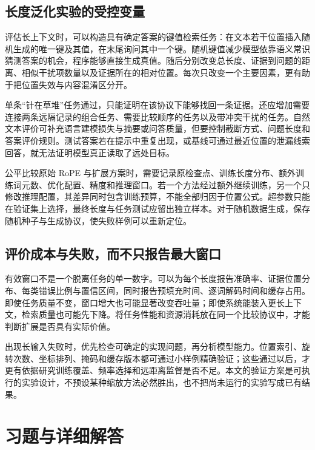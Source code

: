 \documentclass[UTF8,12pt,a4paper,fontset=fandol]{ctexart}
\begin{document}
\subsection{长度泛化实验的受控变量}
评估长上下文时，可以构造具有确定答案的键值检索任务：在文本若干位置插入随机生成的唯一键及其值，在末尾询问其中一个键。随机键值减少模型依靠语义常识猜测答案的机会，程序能够直接生成真值。随后分别改变总长度、证据到问题的距离、相似干扰项数量以及证据所在的相对位置。每次只改变一个主要因素，更有助于把位置失效与内容混淆区分开。

单条“针在草堆”任务通过，只能证明在该协议下能够找回一条证据。还应增加需要连接两条远隔记录的组合任务、需要比较顺序的任务以及带冲突干扰的任务。自然文本评价可补充语言建模损失与摘要或问答质量，但要控制截断方式、问题长度和答案评价规则。测试答案若在提示中重复出现，或基线可通过最近位置的泄漏线索回答，就无法证明模型真正读取了远处目标。

公平比较原始 RoPE 与扩展方案时，需要记录原检查点、训练长度分布、额外训练词元数、优化配置、精度和推理窗口。若一个方法经过额外继续训练，另一个只修改推理配置，其差异同时包含训练预算，不能全部归因于位置公式。超参数只能在验证集上选择，最终长度与任务测试应留出独立样本。对于随机数据生成，保存随机种子与生成协议，使失败样例可以重新定位。

\subsection{评价成本与失败，而不只报告最大窗口}
有效窗口不是一个脱离任务的单一数字。可以为每个长度报告准确率、证据位置分布、每类错误比例与置信区间，同时报告预填充时间、逐词解码时间和缓存占用。即使任务质量不变，窗口增大也可能显著改变吞吐量；即使系统能装入更长上下文，检索质量也可能先下降。将任务性能和资源消耗放在同一个比较协议中，才能判断扩展是否具有实际价值。

出现长输入失败时，优先检查可确定的实现问题，再分析模型能力。位置索引、旋转次数、坐标排列、掩码和缓存版本都可通过小样例精确验证；这些通过以后，才更有依据研究训练覆盖、频率选择和远距离监督是否不足。本文的验证方案是可执行的实验设计，不预设某种缩放方法必然胜出，也不把尚未运行的实验写成已有结果。

\section{习题与详细解答}
\label{sec:rope-exercises}
\end{document}
